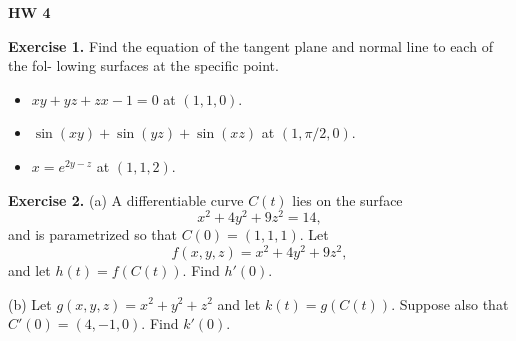\documentclass{article}
\begin{document}

\textbf{HW 4}

\textbf{Exercise 1.} Find the equation of the tangent plane and normal line to each of the fol-
lowing surfaces at the specific point.
\begin{itemize}
    \item $xy+yz+zx-1=0$ at $(1,1,0)$.
    \item $\sin(xy) + \sin(yz) + \sin(xz)$ at $(1,\pi/2,0)$.
    \item $x=e^{2y-z}$ at $(1,1,2)$.
\end{itemize}

\textbf{Exercise 2.} 
(a) A differentiable curve $C(t)$ lies on the surface
\[x^2 + 4y^2 + 9z^2 = 14,\]
and is parametrized so that $C(0) = (1,1,1)$. Let 
\[f(x,y,z) = x^2 + 4y^2 + 9z^2,\]
and let $h(t) = f(C(t))$. Find $h'(0)$.

(b) Let $g(x,y,z) = x^2 + y^2 + z^2$ and let $k(t) = g(C(t))$.
Suppose also that $C'(0)=(4,-1,0)$. Find $k'(0)$.
\end{document}
